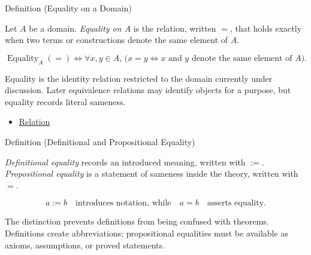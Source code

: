 \begin{definitionbox}{Definition (Equality on a Domain)}
\begin{definition}
\label{def:equality-relation}
Let $A$ be a domain. \emph{Equality on $A$} is the relation, written $=$,
that holds exactly when two terms or constructions denote the same element of
$A$.
\end{definition}

\begin{remark*}
\[
\operatorname{Equality}_A(=)
\Longleftrightarrow
\forall x,y \in A,\,
\bigl(x=y \Longleftrightarrow x \text{ and } y \text{ denote the same element of } A\bigr).
\]
\end{remark*}

\begin{remark*}[Interpretation]
Equality is the identity relation restricted to the domain currently under
discussion. Later equivalence relations may identify objects for a purpose,
but equality records literal sameness.
\end{remark*}

\begin{dependencies}
\begin{itemize}
  \item \hyperref[def:relation]{Relation}
\end{itemize}
\end{dependencies}
\end{definitionbox}

\begin{definitionbox}{Definition (Definitional and Propositional Equality)}
\begin{definition}
\label{def:definitional-propositional-equality}
\emph{Definitional equality} records an introduced meaning, written with
$:=$. \emph{Propositional equality} is a statement of sameness inside the
theory, written with $=$.
\end{definition}

\begin{remark*}
\[
a := b \quad\text{introduces notation, while}\quad a=b \quad\text{asserts equality.}
\]
\end{remark*}

\begin{remark*}[Interpretation]
The distinction prevents definitions from being confused with theorems.
Definitions create abbreviations; propositional equalities must be available
as axioms, assumptions, or proved statements.
\end{remark*}

\NoLocalDependencies
\end{definitionbox}
